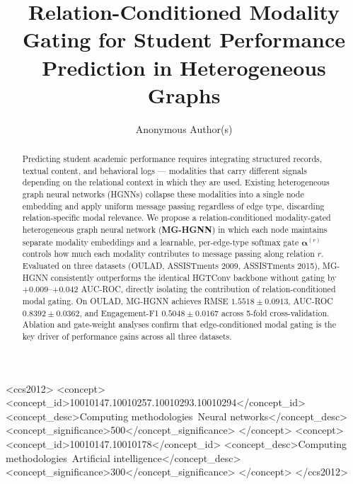 \documentclass[sigconf]{acmart}
\begin{document}
\title{Relation-Conditioned Modality Gating for Student
Performance Prediction in Heterogeneous Graphs}

\author{Anonymous Author(s)}

\begin{CCSXML}
<ccs2012>
  <concept>
    <concept_id>10010147.10010257.10010293.10010294</concept_id>
    <concept_desc>Computing methodologies~Neural networks</concept_desc>
    <concept_significance>500</concept_significance>
  </concept>
  <concept>
    <concept_id>10010147.10010178</concept_id>
    <concept_desc>Computing methodologies~Artificial intelligence</concept_desc>
    <concept_significance>300</concept_significance>
  </concept>
</ccs2012>
\end{CCSXML}



\begin{abstract}
Predicting student academic performance requires integrating structured
records, textual content, and behavioral logs --- modalities that carry
different signals depending on the relational context in which they are
used. Existing heterogeneous graph neural networks (HGNNs) collapse these
modalities into a single node embedding and apply uniform message passing
regardless of edge type, discarding relation-specific modal relevance.
We propose a relation-conditioned modality-gated
heterogeneous graph neural network (\textbf{MG-HGNN})
in which each
node maintains separate modality embeddings and a learnable, per-edge-type
softmax gate $\boldsymbol{\alpha}^{(r)}$ controls how much each modality
contributes to message passing along relation $r$.
Evaluated on three datasets (OULAD, ASSISTments 2009, ASSISTments 2015),
MG-HGNN consistently outperforms the identical HGTConv backbone without
gating by $+0.009$--$+0.042$ AUC-ROC, directly isolating the contribution
of relation-conditioned modal gating. On OULAD, MG-HGNN achieves
RMSE $1.5518 \pm 0.0913$, AUC-ROC $0.8392 \pm 0.0362$, and
Engagement-F1 $0.5048 \pm 0.0167$ across 5-fold cross-validation.
Ablation and gate-weight analyses confirm that edge-conditioned modal
gating is the key driver of performance gains across all three datasets.
\end{abstract}
\end{document}
